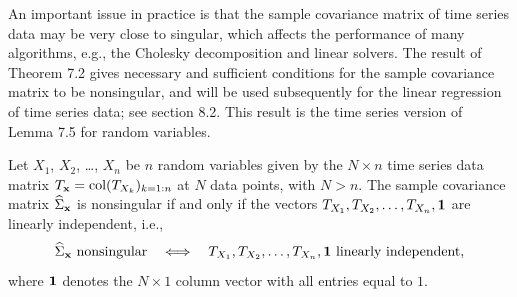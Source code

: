 An important issue in practice is that the sample covariance matrix of time series
data may be very close to singular, which affects the performance of many
algorithms, e.g., the Cholesky decomposition and linear solvers. The result of
Theorem 7.2 gives necessary and sufficient conditions for the sample covariance
matrix to be nonsingular, and will be used subsequently for the linear regression
of time series data; see section 8.2. This result is the time series version of
Lemma 7.5 for random variables.

\begin{theorem}
Let $X_1$, $X_2$, \ldots, $X_n$ be $n$ random variables given by the $N \times n$
time series data matrix $T_{\mathbf{x}} = \mathrm{col}(T_{X_k})_{k=1:n}$ at $N$ data
points, with $N > n$. The sample covariance matrix $\widehat{\Sigma}_{\mathbf{x}}$ is
nonsingular if and only if the vectors $T_{X_1}, T_{X_2}, \ldots, T_{X_n}, \mathbf{1}$
are linearly independent, i.e.,
\begin{equation}
\widehat{\Sigma}_{\mathbf{x}} \text{ nonsingular} \quad \Longleftrightarrow \quad T_{X_1},T_{X_2},\ldots,T_{X_n},\mathbf{1} \text{ linearly independent},
\end{equation}
where $\mathbf{1}$ denotes the $N \times 1$ column vector with all entries equal to $1$.
\end{theorem}

